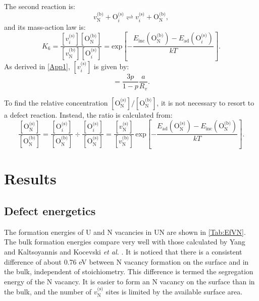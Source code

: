 \documentclass[preprint,12pt,sort&compress]{elsarticle}
\newcommand{\?}{\stackrel{?}{=}}
\begin{document}
The second reaction is:
\begin{equation}
v_\text{N}^\text{(b)} + \text{O}_i^\text{(s)}  \rightleftharpoons v_i^\text{(s)} + \text{O}_\text{N}^\text{(b)},
\end{equation}
and its mass-action law is:
\begin{equation}
K_6 = \frac{ [ v_i^\text{(s)} ]  [ \text{O}_\text{N}^\text{(b)} ] }{ [ v_\text{N}^\text{(b)} ] [ \text{O}_i^\text{(s)} ] } = \text{exp}\! \left[ - \frac{ E_\text{inc}( \text{O}_\text{N}^\text{(b)} ) - E_\text{ad}( \text{O}_i^\text{(s)} ) }{ k T } \right].
\end{equation}
As derived in \ref{App1}, $[ v_i^\text{(s)} ]$ is given by:
\begin{equation}
[ v_i^\text{(s)} ] = \frac{3p}{1-p} \frac{a}{R_v}.
\label{Eq:v_i^s}
\end{equation}

To find the relative concentration $[ \text{O}_\text{N}^\text{(s)} ] / [ \text{O}_\text{N}^\text{(b)} ]$, it is not necessary to resort to a defect reaction. Instead, the ratio is calculated from: 
\begin{equation}
\frac{ [ \text{O}_\text{N}^\text{(s)} ] }{ [ \text{O}_\text{N}^\text{(b)} ] } = \frac{ [ \text{O}_i^\text{(s)} ] }{ [ \text{O}_\text{N}^\text{(b)} ] } \div \frac{ [ \text{O}_i^\text{(s)} ] }{ [ \text{O}_\text{N}^\text{(s)} ] } = \frac{ [v_\text{N}^\text{(s)}] }{ [v_\text{N}^\text{(b)}] } \, \text{exp}\! \left[ - \frac{ E_\text{ad}( \text{O}_\text{N}^\text{(s)} ) - E_\text{inc}( \text{O}_\text{N}^\text{(b)} ) }{ k T } \right].
\label{Eq:ONs_ONb}
\end{equation}

\section{Results}
\label{Sec:Results}

\subsection{Defect energetics}
\label{Sec:DefE}

The formation energies of U and N vacancies in UN are shown in \cref{Tab:EfVN}. The bulk formation energies compare very well with those calculated by Yang and Kaltsoyannis \cite{Yang2021} and Kocevski \textit{et al.} \cite{Kocevski2022I}. It is noticed that there is a consistent difference of about 0.76 eV between N vacancy formation on the surface and in the bulk, independent of stoichiometry. This difference is termed the segregation energy of the N vacancy. It is easier to form an N vacancy on the surface than in the bulk, and the number of $v_\text{N}^\text{(s)}$ sites is limited by the available surface area.
\end{document}
